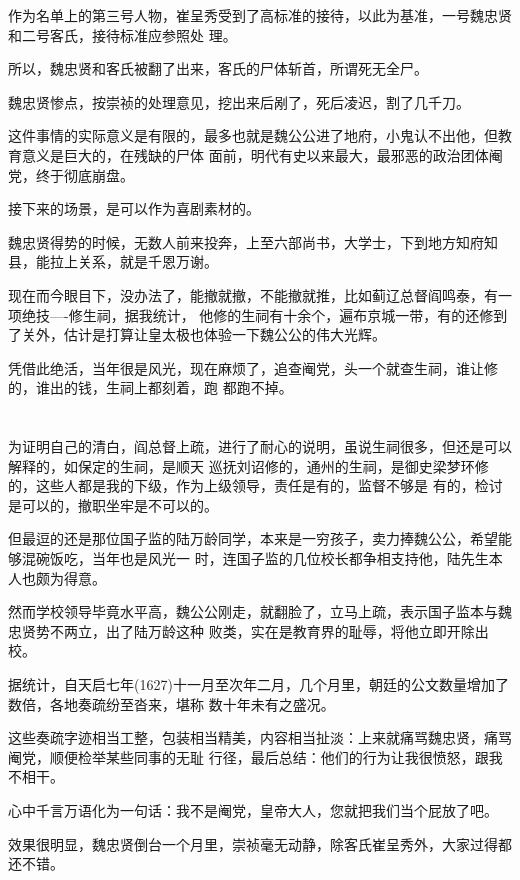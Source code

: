 \documentclass[11pt,a4paper,onecolumn]{article}
\begin{document}
作为名单上的第三号人物，崔呈秀受到了高标准的接待，以此为基准，一号魏忠贤和二号客氏，接待标准应参照处
理。

所以，魏忠贤和客氏被翻了出来，客氏的尸体斩首，所谓死无全尸。

魏忠贤惨点，按崇祯的处理意见，挖出来后剐了，死后凌迟，割了几千刀。

这件事情的实际意义是有限的，最多也就是魏公公进了地府，小鬼认不出他，但教育意义是巨大的，在残缺的尸体
面前，明代有史以来最大，最邪恶的政治团体阉党，终于彻底崩盘。

接下来的场景，是可以作为喜剧素材的。

魏忠贤得势的时候，无数人前来投奔，上至六部尚书，大学士，下到地方知府知县，能拉上关系，就是千恩万谢。

现在而今眼目下，没办法了，能撤就撤，不能撤就推，比如蓟辽总督阎鸣泰，有一项绝技----修生祠，据我统计，
他修的生祠有十余个，遍布京城一带，有的还修到了关外，估计是打算让皇太极也体验一下魏公公的伟大光辉。

凭借此绝活，当年很是风光，现在麻烦了，追查阉党，头一个就查生祠，谁让修的，谁出的钱，生祠上都刻着，跑
都跑不掉。

\section[\thesection]{}

为证明自己的清白，阎总督上疏，进行了耐心的说明，虽说生祠很多，但还是可以解释的，如保定的生祠，是顺天
巡抚刘诏修的，通州的生祠，是御史梁梦环修的，这些人都是我的下级，作为上级领导，责任是有的，监督不够是
有的，检讨是可以的，撤职坐牢是不可以的。

但最逗的还是那位国子监的陆万龄同学，本来是一穷孩子，卖力捧魏公公，希望能够混碗饭吃，当年也是风光一
时，连国子监的几位校长都争相支持他，陆先生本人也颇为得意。

然而学校领导毕竟水平高，魏公公刚走，就翻脸了，立马上疏，表示国子监本与魏忠贤势不两立，出了陆万龄这种
败类，实在是教育界的耻辱，将他立即开除出校。

据统计，自天启七年(1627)十一月至次年二月，几个月里，朝廷的公文数量增加了数倍，各地奏疏纷至沓来，堪称
数十年未有之盛况。

这些奏疏字迹相当工整，包装相当精美，内容相当扯淡：上来就痛骂魏忠贤，痛骂阉党，顺便检举某些同事的无耻
行径，最后总结：他们的行为让我很愤怒，跟我不相干。

心中千言万语化为一句话：我不是阉党，皇帝大人，您就把我们当个屁放了吧。

效果很明显，魏忠贤倒台一个月里，崇祯毫无动静，除客氏崔呈秀外，大家过得都还不错。
\end{document}
